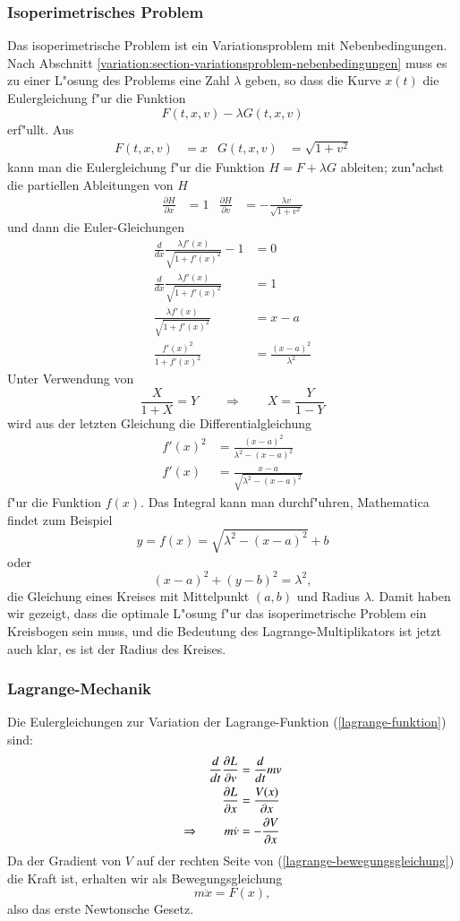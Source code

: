 \subsubsection{Isoperimetrisches Problem}
Das isoperimetrische Problem ist ein Variationsproblem mit
Nebenbedingungen.
Nach Abschnitt 
\ref{variation:section-variationsproblem-nebenbedingungen}
muss es zu einer L"osung des Problems eine Zahl $\lambda$
geben, so dass die Kurve $x(t)$ die Eulergleichung f"ur die Funktion
\[
F(t,x,v)-\lambda G(t,x,v)
\]
erf"ullt. Aus
\begin{align*}
F(t,x,v) &= x&
G(t,x,v) &= \sqrt{1+v^2}
\end{align*}
kann man die Eulergleichung f"ur die Funktion $H=F+\lambda G$
ableiten; zun"achst die partiellen Ableitungen von $H$
\begin{align*}
\frac{\partial H}{\partial x}&=1
&
\frac{\partial H}{\partial v}&=-\frac{\lambda v}{\sqrt{1+v^2}}
\end{align*}
und dann die Euler-Gleichungen
\begin{align*}
\frac{d}{dx} \frac{\lambda f'(x)}{\sqrt{1+f'(x)^2}}-1&=0
\\
\frac{d}{dx} \frac{\lambda f'(x)}{\sqrt{1+f'(x)^2}}&=1
\\
\frac{\lambda f'(x)}{\sqrt{1+f'(x)^2}}&=x - a
\\
\frac{f'(x)^2}{1+f'(x)^2}&=\frac{(x-a)^2}{\lambda^2}
\end{align*}
Unter Verwendung von
\[
\frac{X}{1+X}=Y
\qquad
\Rightarrow
\qquad
X=\frac{Y}{1-Y}
\]
wird aus der letzten Gleichung die Differentialgleichung
\begin{align*}
f'(x)^2&=\frac{(x-a)^2}{\lambda^2-(x-a)^2}
\\
f'(x)&=\frac{x-a}{\sqrt{\lambda^2-(x-a)^2}}
\end{align*}
f"ur die Funktion $f(x)$. Das Integral kann man durchf"uhren, 
Mathematica findet zum Beispiel
\[
y=f(x)=\sqrt{\lambda^2 - (x-a)^2}+b
\]
oder
\[
(x-a)^2+(y-b)^2=\lambda^2,
\]
die Gleichung eines Kreises mit Mittelpunkt $(a,b)$ und Radius
$\lambda$.
Damit haben wir gezeigt, dass die optimale L"osung f"ur das
isoperimetrische Problem ein Kreisbogen sein muss, und die
Bedeutung des Lagrange-Multiplikators ist jetzt auch klar, es
ist der Radius des Kreises.


\subsubsection{Lagrange-Mechanik}
Die Eulergleichungen zur Variation der Lagrange-Funktion
(\ref{lagrange-funktion}) sind:
\begin{align}
\frac{d}{dt}\frac{\partial L}{\partial v}&=\frac{d}{dt}mv
\notag
\\
\frac{\partial L}{\partial x}&=\frac{V(x)}{\partial x}
\notag
\\
\Rightarrow\qquad
m\dot v&=-\frac{\partial V}{\partial x}
\label{lagrange-bewegungsgleichung}
\end{align}
Da der Gradient von $V$ auf der rechten Seite von
(\ref{lagrange-bewegungsgleichung}) die Kraft ist, erhalten wir als
Bewegungsgleichung
\begin{equation}
m\ddot x=F(x),
\end{equation}
also das erste Newtonsche Gesetz.

